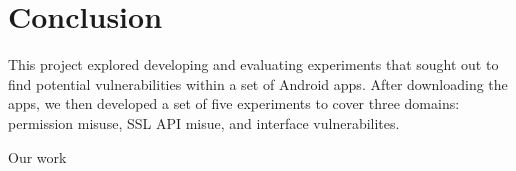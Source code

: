 \section{Conclusion}
\label{sec:conc}


This project explored developing and evaluating experiments that sought out to find potential vulnerabilities within a set of Android apps. 
After downloading the apps, we then developed a set of five experiments to cover three domains: permission misuse, SSL API misue, and interface vulnerabilites.

Our work
